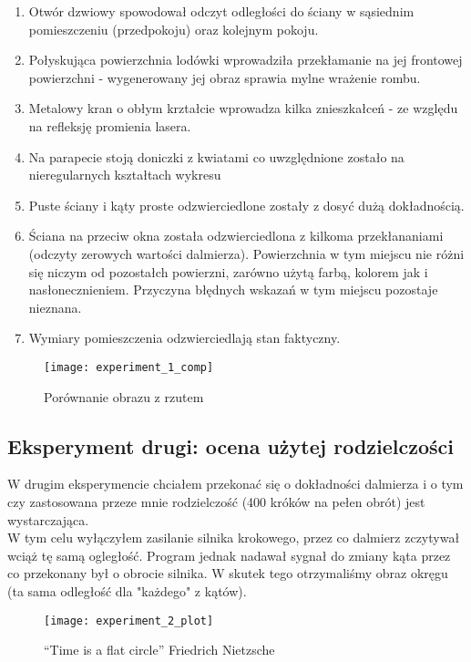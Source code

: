 \begin{enumerate}
    \item Otwór dzwiowy spowodował odczyt odległości do ściany w sąsiednim pomieszczeniu (przedpokoju) oraz kolejnym pokoju.
    \item Połyskująca powierzchnia lodówki wprowadziła przekłamanie na jej frontowej powierzchni - wygenerowany jej obraz sprawia mylne wrażenie rombu. 
    \item Metalowy kran o obłym krztałcie wprowadza kilka znieszkałceń - ze względu na refleksję promienia lasera.
    \item Na parapecie stoją doniczki z kwiatami co uwzględnione zostało na nieregularnych kształtach wykresu
    \item Puste ściany i kąty proste odzwierciedlone zostały z dosyć dużą dokładnością.
    \item Ściana na przeciw okna została odzwierciedlona z kilkoma przekłananiami (odczyty zerowych wartości dalmierza). Powierzchnia w tym miejscu nie różni się niczym od pozostałch powierzni, zarówno użytą farbą, kolorem jak i nasłonecznieniem. Przyczyna błędnych wskazań w tym miejscu pozostaje nieznana.
    \item Wymiary pomieszczenia odzwierciedlają stan faktyczny.
\end{enumerate}
\begin{figure}[h]
    \centering
    \texttt{[image: experiment\_1\_comp]}
    \caption{Porównanie obrazu z rzutem}
    \label{fig:experiment_1_comp}
\end{figure}

\newpage
\subsection {Eksperyment drugi: ocena użytej rodzielczości}

W drugim eksperymencie chciałem przekonać się o dokładności dalmierza i o tym czy zastosowana przeze mnie rodzielczość (400 króków na pełen obrót) jest wystarczająca.\\

W tym celu wyłączyłem zasilanie silnika krokowego, przez co dalmierz zczytywał wciąż tę samą ogległość. Program jednak nadawał sygnał do zmiany kąta przez co przekonany był o obrocie silnika. W skutek tego otrzymaliśmy obraz okręgu (ta sama odległość dla "każdego" z kątów).

\begin{figure}[h]
    \centering
    \texttt{[image: experiment\_2\_plot]}
    \caption{“Time is a flat circle” Friedrich Nietzsche}
    \label{fig:experiment_2_plot}
\end{figure}

